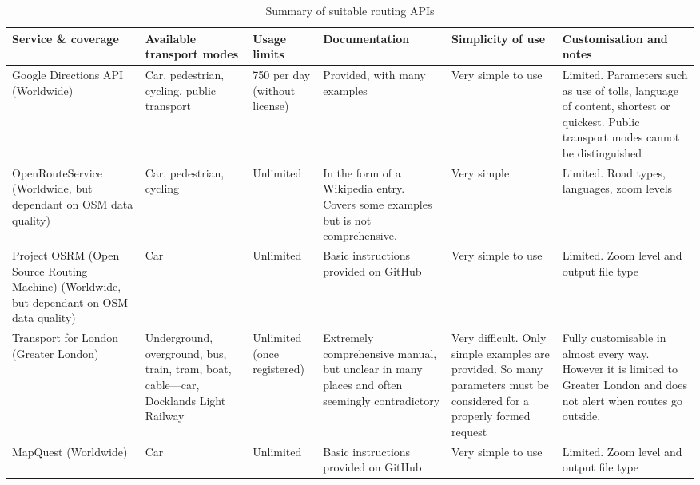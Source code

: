 \begin{landscape}

\begin{table}
\caption{Summary of suitable routing APIs}
    \hspace*{-.1cm}%
    \begin{tabular}{@{}| R{3.3cm} | R{3.2cm} | R{1.9cm} | R{3.2cm} | R{3.4cm} | R{4.5cm} |@{}}

    \hline

\textbf{Service \& coverage} & \textbf{Available transport modes} & \textbf{Usage limits} & \textbf{Documentation} & \textbf{Simplicity of use} & \textbf{Customisation and notes} \\ \hline

Google Directions API (Worldwide) & Car, pedestrian, cycling, public transport & 750 per day (without license) & Provided, with many examples & Very simple to use & Limited. Parameters such as use of tolls, language of content, shortest or quickest. Public transport modes cannot be distinguished \\ \hline

OpenRouteService (Worldwide, but dependant on OSM data quality) & Car, pedestrian, cycling & Unlimited & In the form of a Wikipedia entry. Covers some examples but is not comprehensive. & Very simple & Limited. Road types, languages, zoom levels \\ \hline

Project OSRM (Open Source Routing Machine) (Worldwide, but dependant on OSM data quality) & Car & Unlimited & Basic instructions provided on GitHub & Very simple to use & Limited. Zoom level and output file type \\ \hline

Transport for London (Greater London) & Underground, overground, bus, train, tram, boat, cable---car, Docklands Light Railway & Unlimited (once registered) & Extremely comprehensive manual, but unclear in many places and often seemingly contradictory & Very difficult. Only simple examples are provided. So many parameters must be considered for a properly formed request & Fully customisable in almost every way. However it is limited to Greater London and does not alert when routes go outside. \\ \hline

MapQuest (Worldwide) & Car & Unlimited & Basic instructions provided on GitHub & Very simple to use & Limited. Zoom level and output file type \\ \hline

\end{tabular}\hspace*{-2cm}%
\label{tab:api_summary_table}
\vspace{-1cm}%
\end{table}
\end{landscape}

